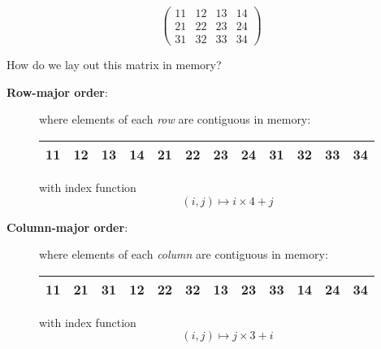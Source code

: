 \documentclass[rgb,dvipsnames,aspectratio=169,xcolor=table]{beamer}
\begin{document}
\begin{frame}

\begin{equation*}
  \begin{pmatrix}
    11 & 12 & 13 & 14 \\
    21 & 22 & 23 & 24 \\
    31 & 32 & 33 & 34
  \end{pmatrix}
\end{equation*}

How do we lay out this matrix in memory?\pause

\bigskip

\begin{description}
\item[\textbf{Row-major order}:] where elements of each \textit{row} are
  contiguous in memory:

  \begin{center}
  \begin{tabular}{|c|c|c|c|c|c|c|c|c|c|c|c|}
    \hline
    11&12&13&14&21&22&23&24&31&32&33&34\\
    \hline
  \end{tabular}
  \end{center}

  with index function
  \[
    (i,j) \mapsto i\times 4 + j
  \]

\pause

\item[\textbf{Column-major order}:] where elements of each \textit{column}
  are contiguous in memory:

  \begin{center}
  \begin{tabular}{|c|c|c|c|c|c|c|c|c|c|c|c|}
    \hline
    11&21&31&12&22&32&13&23&33&14&24&34\\
    \hline
  \end{tabular}
  \end{center}

  with index function
  \[
    (i,j) \mapsto j\times 3 + i
  \]
\end{description}

\end{frame}
\end{document}
